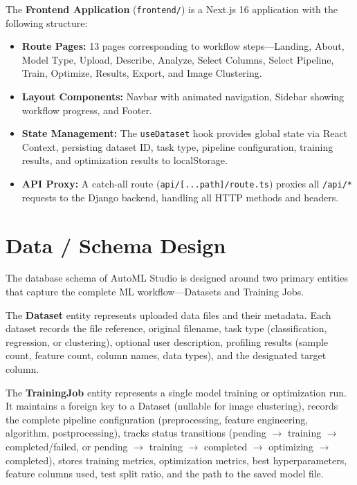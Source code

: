 \documentclass[12pt,a4paper]{report}
\begin{document}
The \textbf{Frontend Application} (\texttt{frontend/}) is a Next.js 16 application with the following structure:
\begin{itemize}
    \item \textbf{Route Pages:} 13 pages corresponding to workflow steps—Landing, About, Model Type, Upload, Describe, Analyze, Select Columns, Select Pipeline, Train, Optimize, Results, Export, and Image Clustering.
    \item \textbf{Layout Components:} Navbar with animated navigation, Sidebar showing workflow progress, and Footer.
    \item \textbf{State Management:} The \texttt{useDataset} hook provides global state via React Context, persisting dataset ID, task type, pipeline configuration, training results, and optimization results to localStorage.
    \item \textbf{API Proxy:} A catch-all route (\texttt{api/[...path]/route.ts}) proxies all \texttt{/api/*} requests to the Django backend, handling all HTTP methods and headers.
\end{itemize}

\section{Data / Schema Design}

The database schema of AutoML Studio is designed around two primary entities that capture the complete ML workflow—Datasets and Training Jobs.

The \textbf{Dataset} entity represents uploaded data files and their metadata. Each dataset records the file reference, original filename, task type (classification, regression, or clustering), optional user description, profiling results (sample count, feature count, column names, data types), and the designated target column.

The \textbf{TrainingJob} entity represents a single model training or optimization run. It maintains a foreign key to a Dataset (nullable for image clustering), records the complete pipeline configuration (preprocessing, feature engineering, algorithm, postprocessing), tracks status transitions (pending $\rightarrow$ training $\rightarrow$ completed/failed, or pending $\rightarrow$ training $\rightarrow$ completed $\rightarrow$ optimizing $\rightarrow$ completed), stores training metrics, optimization metrics, best hyperparameters, feature columns used, test split ratio, and the path to the saved model file.
\end{document}
